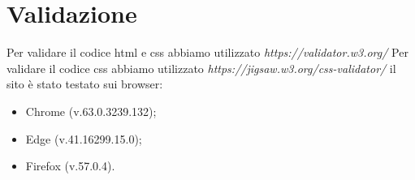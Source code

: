 \section{Validazione}
Per validare il codice html e css abbiamo utilizzato \emph{https://validator.w3.org/} \newline
Per validare il codice css abbiamo utilizzato \emph{https://jigsaw.w3.org/css-validator/} \newline
il sito è stato testato sui browser:
\begin{itemize}
    \item Chrome (v.63.0.3239.132);
    \item Edge (v.41.16299.15.0);
    \item Firefox (v.57.0.4).	
\end{itemize}